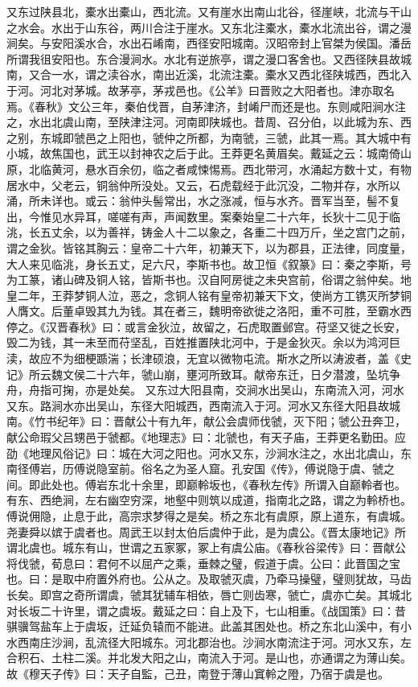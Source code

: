 \documentclass[12pt,UTF8]{ctexbook}
\begin{document}
又东过陕县北，橐水出橐山，西北流。又有崖水出南山北谷，径崖峡，北流与干山之水会。水出于山东谷，两川合注于崖水。又东北注橐水，橐水北流出谷，谓之漫涧矣。与安阳溪水合，水出石崤南，西径安阳城南。汉昭帝封上官桀为侯国。潘岳所谓我徂安阳也。东合漫涧水。水北有逆旅亭，谓之漫口客舍也。又西径陕县故城南，又合一水，谓之渎谷水，南出近溪，北流注橐。橐水又西北径陕城西，西北入于河。河北对茅城。故茅亭，茅戎邑也。《公羊》曰晋败之大阳者也。津亦取名焉。《春秋》文公三年，秦伯伐晋，自茅津济，封崤尸而还是也。东则咸阳涧水注之，水出北虞山南，至陕津注河。河南即陕城也。昔周、召分伯，以此城为东、西之别，东城即虢邑之上阳也，虢仲之所都，为南虢，三虢，此其一焉。其大城中有小城，故焦国也，武王以封神农之后于此。王莽更名黄眉矣。戴延之云：城南倚山原，北临黄河，悬水百余仞，临之者咸悚惕焉。西北带河，水涌起方数十丈，有物居水中，父老云，铜翁仲所没处。又云，石虎载经于此沉没，二物并存，水所以涌，所未详也。或云：翁仲头髻常出，水之涨减，恒与水齐。晋军当至，髻不复出，今惟见水异耳，嗟嗟有声，声闻数里。案秦始皇二十六年，长狄十二见于临洮，长五丈余，以为善祥，铸金人十二以象之，各重二十四万斤，坐之宫门之前，谓之金狄。皆铭其胸云：皇帝二十六年，初兼天下，以为郡县，正法律，同度量，大人来见临洮，身长五丈，足六尺，李斯书也。故卫恒《叙篆》曰：秦之李斯，号为工篆，诸山碑及铜人铭，皆斯书也。汉自阿房徙之未央宫前，俗谓之翁仲矣。地皇二年，王莽梦铜人泣，恶之，念铜人铭有皇帝初兼天下文，使尚方工镌灭所梦铜人膺文。后董卓毁其九为钱。其在者三，魏明帝欲徙之洛阳，重不可胜，至霸水西停之。《汉晋春秋》曰：或言金狄泣，故留之，石虎取置邺宫。苻坚又徙之长安，毁二为钱，其一未至而苻坚乱，百姓推置陕北河中，于是金狄灭。余以为鸿河巨渎，故应不为细梗踬湍；长津硕浪，无宜以微物屯流。斯水之所以涛波者，盖《史记》所云魏文侯二十六年，虢山崩，壅河所致耳。献帝东迁，日夕潜渡，坠坑争舟，舟指可掬，亦是处矣。
又东过大阳县南，交涧水出吴山，东南流入河，河水又东。路涧水亦出吴山，东径大阳城西，西南流入于河。河水又东径大阳县故城南。《竹书纪年》曰：晋献公十有九年，献公会虞师伐虢，灭下阳；虢公丑奔卫，献公命瑕父吕甥邑于虢都。《地理志》曰：北虢也，有天子庙，王莽更名勤田。应劭《地理风俗记》曰：城在大河之阳也。河水又东，沙涧水注之，水出北虞山，东南径傅岩，历傅说隐室前。俗名之为圣人窟。孔安国《传》，傅说隐于虞、虢之间。即此处也。傅岩东北十余里，即巅軨坂也，《春秋左传》所谓入自巅軨者也。有东、西绝涧，左右幽空穷深，地壑中则筑以成道，指南北之路，谓之为軨桥也。傅说佣隐，止息于此，高宗求梦得之是矣。桥之东北有虞原，原上道东，有虞城。尧妻舜以嫔于虞者也。周武王以封太伯后虞仲于此，是为虞公。《晋太康地记》所谓北虞也。城东有山，世谓之五家冢，冢上有虞公庙。《春秋谷梁传》曰：晋献公将伐虢，荀息曰：君何不以屈产之乘，垂棘之璧，假道于虞。公曰：此晋国之宝也。曰：是取中府置外府也。公从之。及取虢灭虞，乃牵马操璧，璧则犹故，马齿长矣。即宫之奇所谓虞，虢其犹辅车相依，唇亡则齿寒，虢亡，虞亦亡矣。其城北对长坂二十许里，谓之虞坂。戴延之曰：自上及下，七山相重。《战国策》曰：昔骐骥驾盐车上于虞坂，迁延负辕而不能进。此盖其困处也。桥之东北山溪中，有小水西南庄沙涧，乱流径大阳城东。河北郡治也。沙涧水南流注于河。河水又东，左合积石、土柱二溪。并北发大阳之山，南流入于河。是山也，亦通谓之为薄山矣。故《穆天子传》曰：天子自監，己丑，南登于薄山窴軨之隥，乃宿于虞是也。
\end{document}

